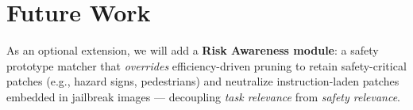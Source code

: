 \documentclass{article}
\begin{document}
\section*{Future Work}

As an optional extension, we will add a \textbf{Risk Awareness module}:
a safety prototype matcher that \emph{overrides} efficiency-driven pruning
to retain safety-critical patches (e.g., hazard signs, pedestrians) and
neutralize instruction-laden patches embedded in jailbreak images —
decoupling \emph{task relevance} from \emph{safety relevance}.
\end{document}
